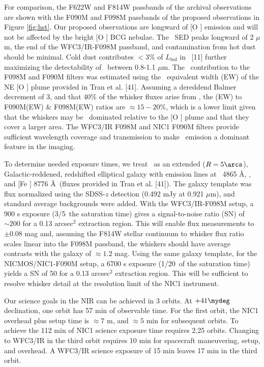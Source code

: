 \documentclass[11pt]{article}
\begin{document}
For comparison, the F622W and F814W passbands of the archival
observations are shown with the F090M and F098M passbands of the
proposed observations in Figure \ref{fig:hst}.  Our proposed
observations are longward of [O ] emission and will not be
affected by the bright [O ] BCG nebulae. The \irs\ SED peaks
longward of 2 $\mu$m, the end of the WFC3/IR-F098M passband, and
contamination from hot dust should be minimal. Cold dust contributes
$< 3\%$ of $L_{\mathrm{bol}}$ in \irs\ [11] further maximizing the
detectability of \halpha\ between 0.8-1.1 $\mu$m. The
\halpha\ contribution to the F098M and F090M filters was estimated
using the \hbeta\ equivalent width (EW) of the NE [O ] plume
provided in Tran et al. [41]. Assuming a dereddend Balmer decrement of
3, and that 40\% of the whisker fluxes arise from \halpha, the
\halpha(EW) to F090M(EW) \& F098M(EW) ratios are $\approx 15-20\%$,
which is a lower limit given that the whiskers may be
\halpha\ dominated relative to the [O ] plume and that they
cover a larger area. The WFC3/IR F098M and NIC1 F090M filters provide
sufficient wavelength coverage and transmission to make
\halpha\ emission a dominant feature in the imaging.

To determine needed exposure times, we treat \irs\ as an extended ($R
= 5\arcs$), Galactic-reddened, redshifted elliptical galaxy with
emission lines at \hbeta\ 4865 \AA, \oiii, and [Fe ] 8776
\AA\ (fluxes provided in Tran et al. [41]). The galaxy template was
flux normalized using the SDSS-$z$ detection (0.492 mJy at 0.921
$\mu$m), and standard average backgrounds were added. With the
WFC3/IR-F098M setup, a 900 s exposure (3/5\ths\ the saturation time)
gives a signal-to-noise ratio (SN) of $\sim 200$ for a 0.13 arcsec$^2$
extraction region. This will enable flux measurements to $\pm 0.08$
mag and, assuming the F814W stellar continuum to whisker flux ratio
scales linear into the F098M passband, the whiskers should have
average contrasts with the galaxy of $\approx 1.2$ mag. Using the same
galaxy template, for the NICMOS/NIC1-F090M setup, a 6700 s exposure
(1/20\ths\ of the saturation time) yields a SN of 50 for a 0.13
arcsec$^2$ extraction region. This will be sufficient to resolve
whisker detail at the resolution limit of the NIC1 instrument.

Our science goals in the NIR can be achieved in 3 orbits. At
$+41\mydeg$ declination, one orbit has 57 min of observable time. For
the first orbit, the NIC1 overhead plus setup time is $\approx 7$ m,
and $\approx 5$ min for subsequent orbits. To achieve the 112 min of
NIC1 science exposure time requires 2.25 orbits. Changing to WFC3/IR
in the third orbit requires 10 min for spacecraft maneuvering, setup,
and overhead. A WFC3/IR science exposure of 15 min leaves 17 min in
the third orbit.\\
\end{document}
